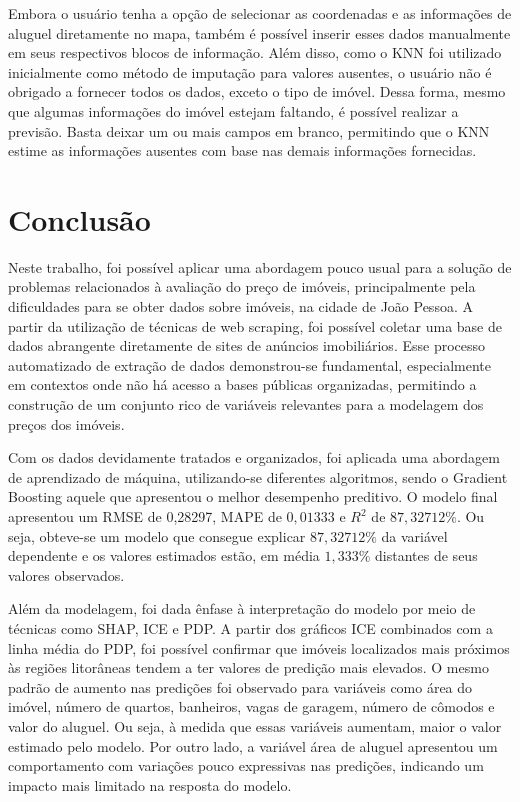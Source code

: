\documentclass[
  12pt,
  a4paper,
]{scrreprt}
\begin{document}
Embora o usuário tenha a opção de selecionar as coordenadas e as
informações de aluguel diretamente no mapa, também é possível inserir
esses dados manualmente em seus respectivos blocos de informação. Além
disso, como o KNN foi utilizado inicialmente como método de imputação
para valores ausentes, o usuário não é obrigado a fornecer todos os
dados, exceto o tipo de imóvel. Dessa forma, mesmo que algumas
informações do imóvel estejam faltando, é possível realizar a previsão.
Basta deixar um ou mais campos em branco, permitindo que o KNN estime as
informações ausentes com base nas demais informações fornecidas.

\chapter{Conclusão}\label{conclusuxe3o}

Neste trabalho, foi possível aplicar uma abordagem pouco usual para a
solução de problemas relacionados à avaliação do preço de imóveis,
principalmente pela dificuldades para se obter dados sobre imóveis, na
cidade de João Pessoa. A partir da utilização de técnicas de web
scraping, foi possível coletar uma base de dados abrangente diretamente
de sites de anúncios imobiliários. Esse processo automatizado de
extração de dados demonstrou-se fundamental, especialmente em contextos
onde não há acesso a bases públicas organizadas, permitindo a construção
de um conjunto rico de variáveis relevantes para a modelagem dos preços
dos imóveis.

\vspace{12pt}

Com os dados devidamente tratados e organizados, foi aplicada uma
abordagem de aprendizado de máquina, utilizando-se diferentes
algoritmos, sendo o Gradient Boosting aquele que apresentou o melhor
desempenho preditivo. O modelo final apresentou um RMSE de 0,28297, MAPE
de \(0,01333\) e \(R^2\) de \(87,32712\%\). Ou seja, obteve-se um modelo
que consegue explicar \(87,32712\%\) da variável dependente e os valores
estimados estão, em média \(1,333\%\) distantes de seus valores
observados.

\vspace{12pt}

Além da modelagem, foi dada ênfase à interpretação do modelo por meio de
técnicas como SHAP, ICE e PDP. A partir dos gráficos ICE combinados com
a linha média do PDP, foi possível confirmar que imóveis localizados
mais próximos às regiões litorâneas tendem a ter valores de predição
mais elevados. O mesmo padrão de aumento nas predições foi observado
para variáveis como área do imóvel, número de quartos, banheiros, vagas
de garagem, número de cômodos e valor do aluguel. Ou seja, à medida que
essas variáveis aumentam, maior o valor estimado pelo modelo. Por outro
lado, a variável área de aluguel apresentou um comportamento com
variações pouco expressivas nas predições, indicando um impacto mais
limitado na resposta do modelo.
\end{document}
